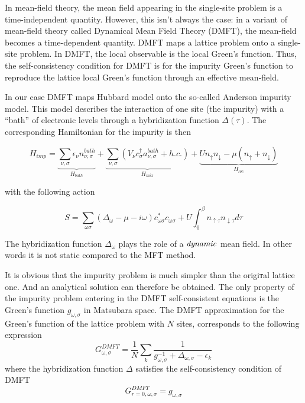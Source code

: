 In mean-field theory, the mean field appearing in the single-site problem is a time-independent quantity.
However, this isn't always the case: in a variant of mean-field theory called Dynamical Mean Field Theory (DMFT), the mean-field becomes a time-dependent quantity.
DMFT maps a lattice problem onto a single-site problem. In DMFT, the local observable is the local Green's function.
Thus, the self-consistency condition for DMFT is for the impurity Green's function to reproduce the lattice local Green's function through an effective mean-field.

In our case DMFT maps Hubbard model onto the so-called Anderson impurity model.
This model describes the interaction of one site (the impurity) with a ``bath'' of electronic levels through a hybridization function $\Delta(\tau)$.
The corresponding Hamiltonian for the impurity is then

\begin{equation} H_{imp} = \underbrace{\sum_{\nu,\sigma}\epsilon_\nu n_{\nu,\sigma}^{bath}}_{H_{bath}} + 
	     \underbrace{\sum_{\nu,\sigma}\left(V_{\nu}c_{\sigma}^{\dagger}a_{\nu,\sigma}^{bath}+h.c.\right)}_{H_{mix}}+
	     \underbrace{U n_{\uparrow} n_{\downarrow}-\mu \left(n_{\uparrow}+n_{\downarrow}\right)}_{H_{loc}}
\end{equation}

with the following action

\begin{equation} S = \sum_{\omega \sigma}(\Delta_\omega-\mu-i\omega)c_{\omega\sigma}^* c_{\omega\sigma} + U\int_0^\beta n_{\uparrow\tau}n_{\downarrow\tau} d\tau \end{equation}

The hybridization function $\Delta_\omega$ plays the role of a $\it{dynamic}$ mean field.
In other words it is not static compared to the MFT method.

It is obvious that the impurity problem is much simpler than the origiтal lattice one. And an analytical solution can therefore be obtained.
The only property of the impurity problem entering in the DMFT self-consistent equations is the Green's function $g_{\omega,\sigma}$ in Matsubara space.
The DMFT approximation for the Green's function of the lattice problem with $N$ sites, corresponds to the following expression
\begin{equation}
 G_{\omega,\sigma}^{DMFT} = \frac{1}{N}\sum_k\frac{1}{g_{\omega,\sigma}^{-1}+\Delta_{\omega,\sigma}-\epsilon_k}
\end{equation}
where the hybridization function $\Delta$ satisfies the self-consistency condition of DMFT
\begin{equation}
 G_{r=0,\omega,\sigma}^{DMFT} = g_{\omega,\sigma}
\end{equation}

